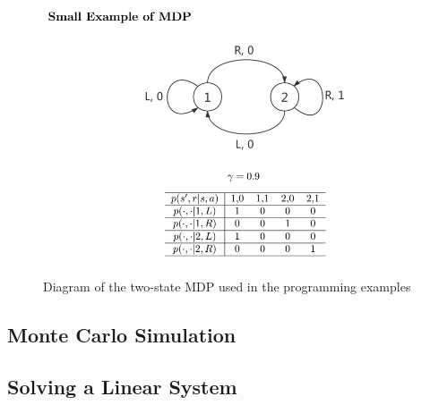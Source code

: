 \documentclass[twoside]{article}
\begin{document}
\newpage
\begin{figure}[h]
    \centering
    \includegraphics[width=1.0\textwidth]{twostatemdp_diagram}
    \caption{Diagram of the two-state MDP used in the programming examples}
    \label{fig:twostatemdp}
\end{figure}

\newpage
\subsection{Monte Carlo Simulation}
\lstset{frame=lines}


\newpage
\subsection{Solving a Linear System}
\lstset{frame=lines}

\end{document}
